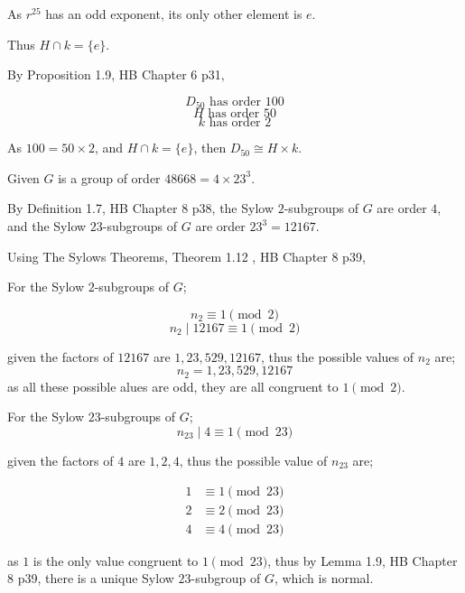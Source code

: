 \documentclass{tufte-handout}
\begin{document}
\begin{question}
As \( r^{25} \) has an odd exponent, its only other element is \( e \).

Thus \( H \cap k = \{ e \} \).

\vspace{2cm}

\qpart

By \textup{Proposition 1.9, HB Chapter 6 p31}, 

\[ D_{50} \text{ has order } 100 \]
\[ H \text{ has order } 50 \]
\[ k \text{ has order } 2 \]

As \( 100 = 50 \times 2 \), and \( H \cap k = \{ e \} \),
then \( D_{50} \cong H \times k \).

\end{question}


\vspace{5cm}

\begin{question}

Given \( G \) is a group of order \( 48668 = 4 \times 23^{3} \).

\qpart

By \textup{Definition 1.7, HB Chapter 8 p38}, the Sylow \(2\)-subgroups of \( G \) are order \( 4 \),
and the Sylow \(23\)-subgroups of \( G \) are order \( 23^{3} = 12167 \).

\vspace{2cm}

\qpart

Using The  Sylows Theorems, \textup{Theorem 1.12 , HB Chapter 8 p39},

For the Sylow \(2\)-subgroups of \( G \);

\[ n_2 \equiv 1 \pmod{2} \]
\[ n_{2} \mid 12167 \equiv 1 \pmod{2}  \]

given the factors of \( 12167 \) are \( 1, 23, 529, 12167 \), thus the possible values of \( n_{2} \) are;
\[ n_{2} = 1, 23, 529, 12167 \]
as all these possible alues are odd, they are all congruent to \( 1 \pmod{2} \).

For the Sylow \(23\)-subgroups of \( G \);
\[ n_{23} \mid 4 \equiv 1 \pmod{23}  \]

given the factors of \( 4 \) are \( 1, 2, 4 \), thus the possible value of \( n_{23} \) are;

\begin{align*}
    1 &\equiv 1 \pmod{23}\\
    2 &\equiv 2 \pmod{23}\\
    4 &\equiv 4 \pmod{23}
\end{align*}


as \( 1 \) is the only value congruent to \( 1 \pmod{23} \), thus by \textup{Lemma 1.9, HB Chapter 8 p39},
there is a unique Sylow \(23\)-subgroup of \( G \), which is normal.

\end{question}
\end{document}
